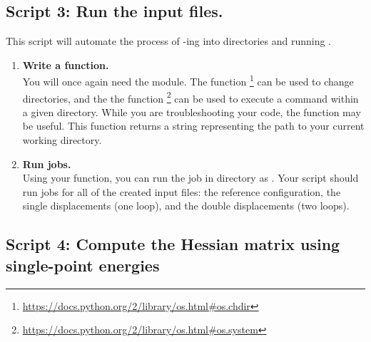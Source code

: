 \documentclass[11pt]{article}
\begin{document}
\subsection{Script 3: Run the input files.}
This script will automate the process of -ing into directories and
running .
\begin{enumerate}[label=\textbf{\arabic*}]
\item {\bf Write a  function.}\\
You will once again need the  module. The  function
\footnote{\url{https://docs.python.org/2/library/os.html\#os.chdir}} can be
used to change directories, and the the  function
\footnote{\url{https://docs.python.org/2/library/os.html\#os.system}} can be
used to execute a command within a given directory. While you are
troubleshooting your code, the  function may be useful. This
function returns a string representing the path to your current working
directory.
\item {\bf Run jobs.}\\
Using your  function, you can run the job in directory
 as . Your script should run jobs for all
of the created input files: the reference configuration, the single
displacements (one  loop), and the double displacements (two 
loops).
\end{enumerate}

\subsection{Script 4: Compute the Hessian matrix using single-point energies}
\end{document}

